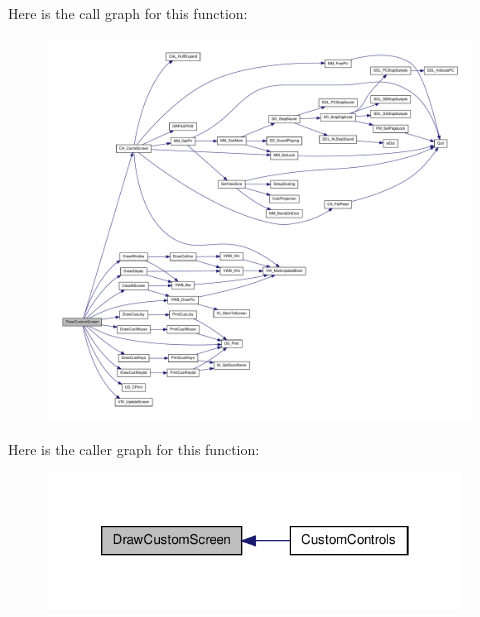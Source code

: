 Here is the call graph for this function:
\nopagebreak
\begin{figure}[H]
\begin{center}
\leavevmode
\includegraphics[width=400pt]{WL__MENU_8C_a2173c3a8943509f99cb5ac01f2a111a6_cgraph}
\end{center}
\end{figure}




Here is the caller graph for this function:
\nopagebreak
\begin{figure}[H]
\begin{center}
\leavevmode
\includegraphics[width=310pt]{WL__MENU_8C_a2173c3a8943509f99cb5ac01f2a111a6_icgraph}
\end{center}
\end{figure}



